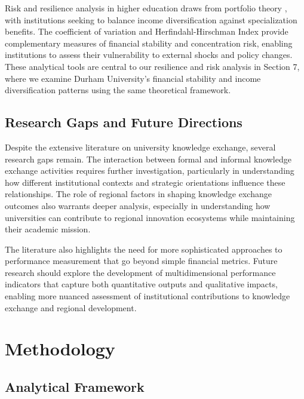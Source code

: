 \documentclass[journal,onecolumn, 10pt,draftclsnofoot]{IEEEtran}
\begin{document}
Risk and resilience analysis in higher education draws from portfolio theory \cite{markowitz1952portfolio,sharpe1964capital}, with institutions seeking to balance income diversification against specialization benefits. The coefficient of variation and Herfindahl-Hirschman Index provide complementary measures of financial stability and concentration risk, enabling institutions to assess their vulnerability to external shocks and policy changes. These analytical tools are central to our resilience and risk analysis in Section 7, where we examine Durham University's financial stability and income diversification patterns using the same theoretical framework.

\subsection{Research Gaps and Future Directions}

Despite the extensive literature on university knowledge exchange, several research gaps remain. The interaction between formal and informal knowledge exchange activities requires further investigation, particularly in understanding how different institutional contexts and strategic orientations influence these relationships. The role of regional factors in shaping knowledge exchange outcomes also warrants deeper analysis, especially in understanding how universities can contribute to regional innovation ecosystems while maintaining their academic mission.

The literature also highlights the need for more sophisticated approaches to performance measurement that go beyond simple financial metrics. Future research should explore the development of multidimensional performance indicators that capture both quantitative outputs and qualitative impacts, enabling more nuanced assessment of institutional contributions to knowledge exchange and regional development.

\section{Methodology}

\subsection{Analytical Framework}
\end{document}
